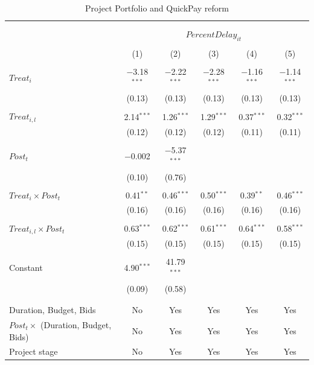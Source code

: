 \documentclass[
]{article}
\begin{document}
\begin{table}[H] \centering 
  \caption{Project Portfolio and QuickPay reform} 
  \label{} 
\small 
\begin{tabular}{@{\extracolsep{-2pt}}lccccc} 
\\[-1.8ex]\hline 
\hline \\[-1.8ex] 
\\[-1.8ex] & \multicolumn{5}{c}{$PercentDelay_{it}$  } \\ 
\\[-1.8ex] & (1) & (2) & (3) & (4) & (5)\\ 
\hline \\[-1.8ex] 
 $Treat_i$ & $-$3.18$^{***}$ & $-$2.22$^{***}$ & $-$2.28$^{***}$ & $-$1.16$^{***}$ & $-$1.14$^{***}$ \\ 
  & (0.13) & (0.13) & (0.13) & (0.13) & (0.13) \\ 
  & & & & & \\ 
 $Treat_{i,l}$ & 2.14$^{***}$ & 1.26$^{***}$ & 1.29$^{***}$ & 0.37$^{***}$ & 0.32$^{***}$ \\ 
  & (0.12) & (0.12) & (0.12) & (0.11) & (0.11) \\ 
  & & & & & \\ 
 $Post_t$ & $-$0.002 & $-$5.37$^{***}$ &  &  &  \\ 
  & (0.10) & (0.76) &  &  &  \\ 
  & & & & & \\ 
 $Treat_i \times Post_t$ & 0.41$^{**}$ & 0.46$^{***}$ & 0.50$^{***}$ & 0.39$^{**}$ & 0.46$^{***}$ \\ 
  & (0.16) & (0.16) & (0.16) & (0.16) & (0.16) \\ 
  & & & & & \\ 
 $Treat_{i,l} \times Post_t$ & 0.63$^{***}$ & 0.62$^{***}$ & 0.61$^{***}$ & 0.64$^{***}$ & 0.58$^{***}$ \\ 
  & (0.15) & (0.15) & (0.15) & (0.15) & (0.15) \\ 
  & & & & & \\ 
 Constant & 4.90$^{***}$ & 41.79$^{***}$ &  &  &  \\ 
  & (0.09) & (0.58) &  &  &  \\ 
  & & & & & \\ 
\hline \\[-1.8ex] 
Duration, Budget, Bids & No & Yes & Yes & Yes & Yes \\ 
$Post_t \times $  (Duration, Budget, Bids) & No & Yes & Yes & Yes & Yes \\ 
Project stage & No & Yes & Yes & Yes & Yes \\ 

\end{tabular}
\end{table}
\end{document}
